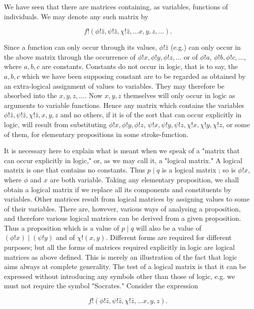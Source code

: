 \documentclass[10pt]{article}
\begin{document}
We have seen that there are matrices containing, as variables, functions of individuals. We may denote any such matrix by

$$
f!(\phi!\hat{z}, \psi!\hat{z}, \chi!\hat{z}, \ldots x, y, z, \ldots) .
$$

Since a function can only occur through its values, $\phi!\hat{z}$ (e.g.) can only occur in the above matrix through the occurrence of $\phi!x, \phi!y, \phi!z, \ldots$ or of $\phi!a$, $\phi!b, \phi!c, \ldots$, where $a, b, c$ are constants. Constants do not occur in logic, that is to say, the $a, b, c$ which we have been supposing constant are to be regarded as obtained by an extra-logical assignment of values to variables. They may therefore be absorbed into the $x, y, z, \ldots$. Now $x, y, z$ themselves will only occur in logic as arguments to variable functions. Hence any matrix which contains the variables $\phi!\hat{z}, \psi!\hat{z}, \chi!\hat{z}, x, y, z$ and no others, if it is of the sort that can occur explicitly in logic, will result from substituting $\phi!x, \phi!y, \phi!z$, $\psi!x, \psi!y, \psi!z, \chi!x, \chi!y, \chi!z$, or some of them, for elementary propositions in some stroke-function.

It is necessary here to explain what is meant when we speak of a "matrix that can occur explicitly in logic," or, as we may call it, a "logical matrix." A logical matrix is one that contains no constants. Thus $p \mid q$ is a logical matrix ; so is $\phi!x$, where $\phi$ and $x$ are both variable. Taking any elementary proposition, we shall obtain a logical matrix if we replace all its components and constituents by variables. Other matrices result from logical matrices by assigning values to some of their variables. There are, however, various ways of analysing a proposition, and therefore various logical matrices can be derived from a given proposition. Thus a proposition which is a value of $p \mid q$ will also be a value of $(\phi!x) \mid(\psi!y)$ and of $\chi!(x, y)$. Different forms are required for different purposes; but all the forms of matrices required explicitly in logic are logical matrices as above defined. This is merely an illustration of the fact that logic aims always at complete generality. The test of a logical matrix is that it can be expressed without introducing any symbols other than those of logic, e.g. we must not require the symbol "Socrates." Consider the expression

$$
f!(\phi!\hat{z}, \psi!\hat{z}, \chi!\hat{z}, \ldots x, y, z) .
$$
\end{document}
